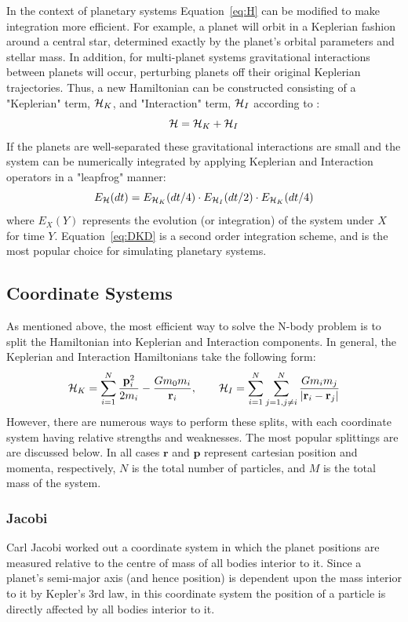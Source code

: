 In the context of planetary systems Equation~\ref{eq:H} can be modified to make integration more efficient.
For example, a planet will orbit in a Keplerian fashion around a central star, determined exactly by the planet's orbital parameters and stellar mass. 
In addition, for multi-planet systems gravitational interactions between planets will occur, perturbing planets off their original Keplerian trajectories.
Thus, a new Hamiltonian can be constructed consisting of a "Keplerian" term, $\mathcal{H}_K$, and "Interaction" term, $\mathcal{H}_I$ according to \citep{Wisdom1991}:
\begin{equation*}
\mathcal{H} = \mathcal{H}_K + \mathcal{H}_I
\end{equation*}
If the planets are well-separated these gravitational interactions are small and the system can be numerically integrated by applying Keplerian and Interaction operators in a "leapfrog" manner:
\begin{equation}
E_{\mathcal{H}}(dt) = E_{\mathcal{H}_K}(dt/4) \cdot E_{\mathcal{H}_I}(dt/2) \cdot E_{\mathcal{H}_K}(dt/4)
\label{eq:DKD}
\end{equation}
where $E_{X}(Y)$ represents the evolution (or integration) of the system under $X$ for time $Y$.
Equation~\ref{eq:DKD} is a second order integration scheme, and is the most popular choice for simulating planetary systems.

\subsection{Coordinate Systems}
As mentioned above, the most efficient way to solve the N-body  problem is to split the Hamiltonian into Keplerian and Interaction components.
In general, the Keplerian and Interaction Hamiltonians take the following form:
\begin{equation}
\mathcal{H}_K = \sum_{i=1}^N \frac{\textbf{p}_i^2}{2m_i} - \frac{Gm_0m_i}{\textbf{r}_i}, \qquad
\mathcal{H}_I = \sum_{i=1}^{N}\sum_{j=1,j \ne i}^N \frac{Gm_im_j}{|\textbf{r}_i - \textbf{r}_j|}
\label{eq:Hgeneral}
\end{equation}
However, there are numerous ways to perform these splits, with each coordinate system having relative strengths and weaknesses. 
The most popular splittings are are discussed below. 
In all cases $\textbf{r}$ and $\textbf{p}$ represent cartesian position and momenta, respectively, $N$ is the total number of particles, and $M$ is the total mass of the system. 

\subsubsection{Jacobi}
\label{sec:Jacobi}
Carl Jacobi worked out a coordinate system in which the planet positions are measured relative to the centre of mass of all bodies interior to it. 
Since a planet's semi-major axis (and hence position) is dependent upon the mass interior to it by Kepler's 3rd law, in this coordinate system the position of a particle is directly affected by all bodies interior to it. 


